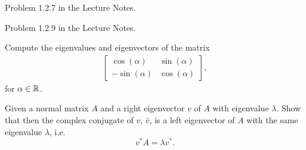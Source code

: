 
\begin{Sheet}
  \label{sheet2}
	
  \begin{Problem}
  	Problem 1.2.7 in the Lecture Notes.
  \end{Problem}

  \begin{Problem}
	Problem 1.2.9 in the Lecture Notes.
  \end{Problem}

  \begin{Problem}
	Compute the eigenvalues and eigenvectors of the matrix
	\begin{gather*}
	\begin{bmatrix}
	\cos(\alpha) & \sin(\alpha) \\
	-\sin(\alpha) & \cos(\alpha)
	\end{bmatrix},
	\end{gather*}
	for $\alpha\in\mathbb R$.
  \end{Problem}

  \begin{Problem}
  	Given a normal matrix $A$ and a right eigenvector $v$ of $A$ with eigenvalue $\lambda$.
  	Show that then the complex conjugate of $v$, $\bar{v}$, is a left eigenvector of $A$ with the same eigenvalue $\lambda$, i.e.
  	\begin{equation*}
  	v^{\ast} A = \lambda v^{\ast}.
  	\end{equation*}
  \end{Problem}


\end{Sheet}

